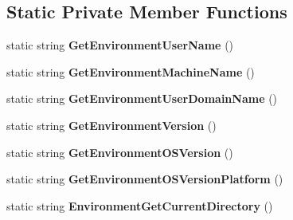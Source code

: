\subsection*{Static Private Member Functions}
\begin{DoxyCompactItemize}
\item 
\mbox{\label{class_unity_test_1_1_xml_result_writer_a23b16d527efe3679ac2c03ab83c4d2da}} 
static string {\bfseries Get\+Environment\+User\+Name} ()
\item 
\mbox{\label{class_unity_test_1_1_xml_result_writer_a8baf9b1930dd306ebe6e3211bf6aaf8d}} 
static string {\bfseries Get\+Environment\+Machine\+Name} ()
\item 
\mbox{\label{class_unity_test_1_1_xml_result_writer_ada8d7349094472d4f8d4c63905b3385c}} 
static string {\bfseries Get\+Environment\+User\+Domain\+Name} ()
\item 
\mbox{\label{class_unity_test_1_1_xml_result_writer_ae7bfdfe4d9ea0c8b90670d4e0e384f99}} 
static string {\bfseries Get\+Environment\+Version} ()
\item 
\mbox{\label{class_unity_test_1_1_xml_result_writer_a0bb4faca7efaca830df4bee49683e9ab}} 
static string {\bfseries Get\+Environment\+O\+S\+Version} ()
\item 
\mbox{\label{class_unity_test_1_1_xml_result_writer_a71189331d2b0f43a7817109fc5adc1a0}} 
static string {\bfseries Get\+Environment\+O\+S\+Version\+Platform} ()
\item 
\mbox{\label{class_unity_test_1_1_xml_result_writer_af601b3342eed0ea1be8fffd8edf19318}} 
static string {\bfseries Environment\+Get\+Current\+Directory} ()
\end{DoxyCompactItemize}

